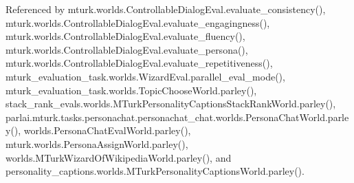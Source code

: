 Referenced by mturk.\+worlds.\+Controllable\+Dialog\+Eval.\+evaluate\+\_\+consistency(), mturk.\+worlds.\+Controllable\+Dialog\+Eval.\+evaluate\+\_\+engagingness(), mturk.\+worlds.\+Controllable\+Dialog\+Eval.\+evaluate\+\_\+fluency(), mturk.\+worlds.\+Controllable\+Dialog\+Eval.\+evaluate\+\_\+persona(), mturk.\+worlds.\+Controllable\+Dialog\+Eval.\+evaluate\+\_\+repetitiveness(), mturk\+\_\+evaluation\+\_\+task.\+worlds.\+Wizard\+Eval.\+parallel\+\_\+eval\+\_\+mode(), mturk\+\_\+evaluation\+\_\+task.\+worlds.\+Topic\+Choose\+World.\+parley(), stack\+\_\+rank\+\_\+evals.\+worlds.\+M\+Turk\+Personality\+Captions\+Stack\+Rank\+World.\+parley(), parlai.\+mturk.\+tasks.\+personachat.\+personachat\+\_\+chat.\+worlds.\+Persona\+Chat\+World.\+parley(), worlds.\+Persona\+Chat\+Eval\+World.\+parley(), mturk.\+worlds.\+Persona\+Assign\+World.\+parley(), worlds.\+M\+Turk\+Wizard\+Of\+Wikipedia\+World.\+parley(), and personality\+\_\+captions.\+worlds.\+M\+Turk\+Personality\+Captions\+World.\+parley().

